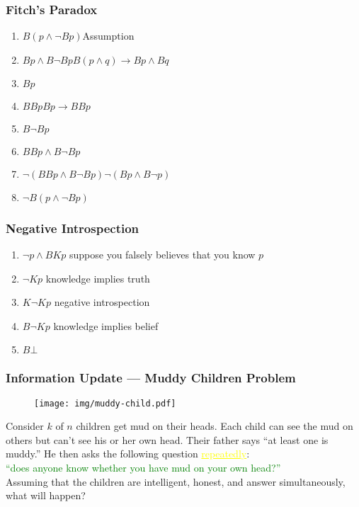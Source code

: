\documentclass[UTF8,aspectratio=43,11pt,colorlinks,compress,openany]{beamer}%
\begin{document}
\begin{frame}\frametitle{Fitch's Paradox}
	\begin{block}{}
		\begin{enumerate}
			\item $B(p\wedge\neg Bp)$\hfill Assumption
			\item $Bp\wedge B\neg Bp$\hfill $B(p\wedge q)\to Bp\wedge Bq$
			\item $Bp$
			\item $BBp$\hfill $Bp\to BBp$
			\item $B\neg Bp$
			\item $BBp\wedge B\neg Bp$
			\item $\neg(BBp\wedge B\neg Bp)$\hfill $\neg(Bp\wedge B\neg p)$
			\item $\neg B(p\wedge\neg Bp)$
		\end{enumerate}
	\end{block}
\end{frame}

\begin{frame}\frametitle{Negative Introspection}
\begin{enumerate}
	\item $\neg p\wedge BKp$ \hfill suppose you falsely believes that you know $p$
	\item $\neg Kp$ \hfill knowledge implies truth
	\item $K\neg Kp$ \hfill negative introspection
	\item $B\neg Kp$ \hfill knowledge implies belief
	\item $B\bot$
\end{enumerate}
\end{frame}

\begin{frame}\frametitle{Information Update --- Muddy Children Problem}
			\begin{figure}
				\texttt{[image: img/muddy-child.pdf]}
			\end{figure}\vspace{-1ex}
	\begin{problem}
		Consider $k$ of $n$ children get mud on their heads. Each child can see the mud on others but can't see his or her own head. Their father says ``at least one is muddy.'' He then asks the following question \textcolor{yellow}{\underline{repeatedly}}:\\
		\textcolor{green}{``does anyone know whether you have mud on your own head?''}\\
		Assuming that the children are intelligent, honest, and answer simultaneously, what will happen?
	\end{problem}
\end{frame}
\end{document}

